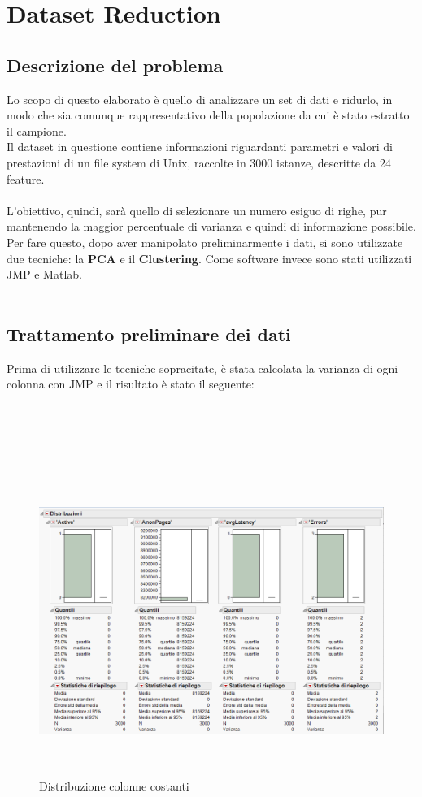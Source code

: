\chapter{Dataset Reduction}

\section{Descrizione del problema}
Lo scopo di questo elaborato è quello di analizzare un set di dati e ridurlo, in modo che sia comunque rappresentativo della popolazione da cui è stato estratto il campione.\\
Il dataset in questione contiene informazioni riguardanti parametri e valori di prestazioni di un file system di Unix, raccolte in 3000 istanze, descritte da 24 feature.\\\\
L'obiettivo, quindi, sarà quello di selezionare un numero esiguo di righe, pur mantenendo la maggior percentuale di varianza e quindi di informazione possibile.\\
Per fare questo, dopo aver manipolato preliminarmente i dati, si sono utilizzate due tecniche: la \textbf{PCA} e il \textbf{Clustering}. Come software invece sono stati utilizzati JMP e Matlab.\\\\

\section{Trattamento preliminare dei dati}
Prima di utilizzare le tecniche sopracitate, è stata calcolata la varianza di ogni colonna con JMP e il risultato è stato il seguente:\\\\\\\\\\

\begin{figure}[!h]
	\centering
	\includegraphics[width=15cm, height=10cm]{./immagine/colonne_costanti.png}
	\caption{Distribuzione colonne costanti}
	\label{fig:colonne_costanti}
\end{figure}

